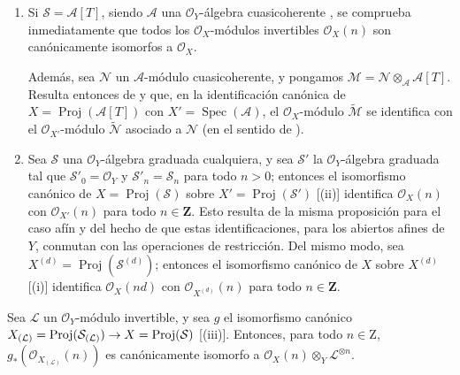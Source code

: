 \documentclass[oneside,10pt]{amsart}
\makeatletter
\newcommand{\ega@arrow}[2]{\mathchoice{#1}{#2}{#2}{#2}}
\renewcommand{\to}{\ega@arrow{\longrightarrow}{\rightarrow}}
\let\EGAOriginalLabel\label
\renewcommand{\label}[1]{\phantomsection\EGAOriginalLabel{#1}}
\makeatother
\begin{document}
\begin{remarks}[3.2.9]
\label{II.3.2.9-fr}
\medskip\noindent
\begin{enumerate}
  \item Si $\mathcal{S}=\mathcal{A}[T]$, siendo $\mathcal{A}$ una $\mathcal{O}_Y$-álgebra cuasicoherente , se comprueba inmediatamente que todos los $\mathcal{O}_X$-módulos invertibles $\mathcal{O}_X(n)$ son canónicamente isomorfos a $\mathcal{O}_X$.

    Además, sea $\mathcal{N}$ un $\mathcal{A}$-módulo cuasicoherente, y pongamos $\mathcal{M}=\mathcal{N}\otimes_{\mathcal{A}}\mathcal{A}[T]$.
    Resulta entonces de  y  que, en la identificación canónica de $X=\operatorname{Proj}(\mathcal{A}[T])$ con $X'=\operatorname{Spec}(\mathcal{A})$, el $\mathcal{O}_X$-módulo $\widetilde{\mathcal{M}}$ se identifica con el $\mathcal{O}_{X'}$-módulo $\widetilde{\mathcal{N}}$ asociado a $\mathcal{N}$ (en el sentido de ).
  \item Sea $\mathcal{S}$ una $\mathcal{O}_Y$-álgebra graduada cualquiera, y sea $\mathcal{S}'$ la $\mathcal{O}_Y$-álgebra graduada tal que $\mathcal{S}'_0=\mathcal{O}_Y$ y $\mathcal{S}'_n=\mathcal{S}_n$ para todo $n>0$; entonces el isomorfismo canónico de $X=\operatorname{Proj}(\mathcal{S})$ sobre $X'=\operatorname{Proj}(\mathcal{S}')$ [(ii)] identifica $\mathcal{O}_X(n)$ con $\mathcal{O}_{X'}(n)$ para todo $n\in\mathbf{Z}$.
    Esto resulta de la misma proposición para el caso afín  y del hecho de que estas identificaciones, para los abiertos afines de $Y$, conmutan con las operaciones de restricción.
    Del mismo modo, sea $X^{(d)}=\operatorname{Proj}(\mathcal{S}^{(d)})$; entonces el isomorfismo canónico de $X$ sobre $X^{(d)}$ [(i)] identifica $\mathcal{O}_X(nd)$ con $\mathcal{O}_{X^{(d)}}(n)$ para todo $n\in\mathbf{Z}$.
\end{enumerate}
\end{remarks}

\begin{proposition}[3.2.10]
\label{II.3.2.10-fr}
Sea $\mathcal{L}$ un $\mathcal{O}_Y$-módulo invertible, y sea $g$ el isomorfismo canónico $X_{(\mathcal{L})}=\operatorname{Proj}(\mathcal{S}_{(\mathcal{L})})
\to X=\operatorname{Proj}(\mathcal{S})$ [(iii)].
Entonces, para todo $n\in\mathrm{Z}$, $g_*(\mathcal{O}_{X_{(\mathcal{L})}}(n))$ es canónicamente isomorfo a $\mathcal{O}_X(n)\otimes_Y\mathcal{L}^{\otimes n}$.
\end{proposition}
\end{document}
